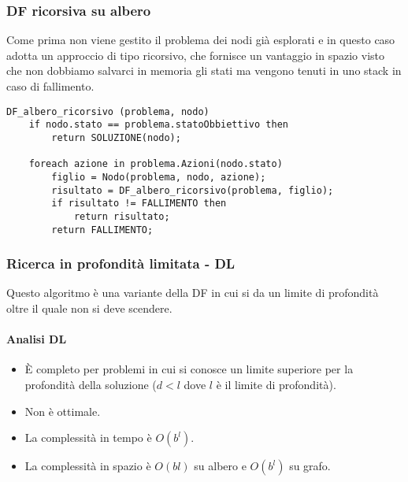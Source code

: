 \subsubsection{DF ricorsiva su albero}
Come prima non viene gestito il problema dei nodi gi\`a esplorati e in questo caso adotta un
approccio di tipo ricorsivo, che fornisce un vantaggio in spazio visto che non dobbiamo
salvarci in memoria gli stati ma vengono tenuti in uno stack in caso di fallimento.
\begin{lstlisting}[style=pseudo-style]
DF_albero_ricorsivo (problema, nodo)
	if nodo.stato == problema.statoObbiettivo then
		return SOLUZIONE(nodo);

	foreach azione in problema.Azioni(nodo.stato)
		figlio = Nodo(problema, nodo, azione);
		risultato = DF_albero_ricorsivo(problema, figlio);
		if risultato != FALLIMENTO then
			return risultato;
		return FALLIMENTO;
\end{lstlisting}

\subsubsection{Ricerca in profondit\`a limitata - DL}
Questo algoritmo \`e una variante della DF in cui si da un limite di profondit\`a oltre
il quale non si deve scendere.

\paragraph{Analisi DL}
\begin{itemize}
	\item \`E completo per problemi in cui si conosce un limite superiore per la profondit\`a
	      della soluzione ($d < l$ dove $l$ \`e il limite di profondit\`a).
	\item Non \`e ottimale.
	\item La complessit\`a in tempo \`e $O(b^l)$.
	\item La complessit\`a in spazio \`e $O(bl)$ su albero e $O(b^l)$ su grafo.
\end{itemize}

